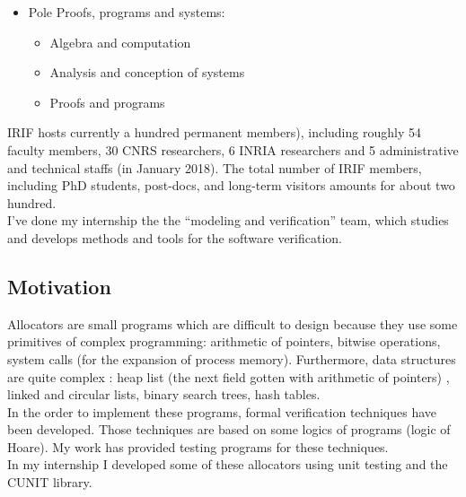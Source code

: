 \begin{itemize}
\item Pole Proofs, programs and systems:
\begin{itemize}
\item Algebra and computation
\end{itemize}
\begin{itemize}
\item Analysis and conception of systems 
\end{itemize}
\begin{itemize}
\item Proofs and programs
\end{itemize}

\end{itemize}
IRIF hosts currently a hundred permanent members), including roughly 54 faculty members, 30 CNRS researchers, 6 INRIA researchers and 5 administrative and technical staffs (in January 2018). The total number of IRIF members, including PhD students, post-docs, and long-term visitors amounts for about two hundred. \\

I've done my internship the the ``modeling and verification'' team, which studies and develops methods and tools for the software verification.


\subsection{Motivation}
Allocators are small programs which are difficult to design because they use some primitives of complex programming: arithmetic of pointers, bitwise operations, system calls (for the expansion of process memory).   
Furthermore, data structures are quite complex : heap list (the next field gotten with arithmetic of pointers) , linked and circular lists, binary search trees, hash tables.\\

In the order to implement these programs, formal verification techniques have been developed. Those techniques are based on some logics of programs (logic of Hoare). My work has provided testing programs for these techniques.\\

In my internship I developed some of these allocators using unit testing and the CUNIT library.\\

